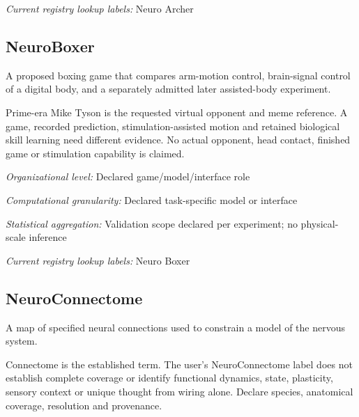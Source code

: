 \noindent\textit{Current registry lookup labels:} Neuro Archer\par

\begin{samepage}
\subsection*{NeuroBoxer}
\noindent A proposed boxing game that compares arm-motion control, brain-signal control of a digital body, and a separately admitted later assisted-body experiment.\par
\end{samepage}
\noindent Prime-era Mike Tyson is the requested virtual opponent and meme reference. A game, recorded prediction, stimulation-assisted motion and retained biological skill learning need different evidence. No actual opponent, head contact, finished game or stimulation capability is claimed.\par
\noindent\textit{Organizational level:} Declared game/model/interface role\par
\noindent\textit{Computational granularity:} Declared task-specific model or interface\par
\begin{samepage}
\noindent\textit{Statistical aggregation:} Validation scope declared per experiment; no physical-scale inference\par\nopagebreak[4]

\end{samepage}


\noindent\textit{Current registry lookup labels:} Neuro Boxer\par

\begin{samepage}
\subsection*{NeuroConnectome}
\noindent A map of specified neural connections used to constrain a model of the nervous system.\par
\end{samepage}
\begin{samepage}
\noindent Connectome is the established term. The user’s NeuroConnectome label does not establish complete coverage or identify functional dynamics, state, plasticity, sensory context or unique thought from wiring alone. Declare species, anatomical coverage, resolution and provenance.\par\nopagebreak[4]

\end{samepage}


